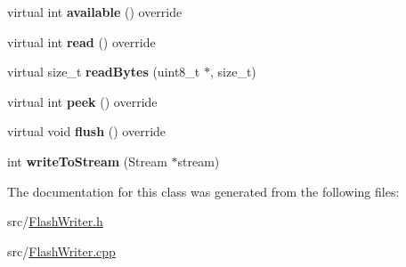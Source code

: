 \begin{DoxyCompactItemize}
virtual int {\bfseries available} () override
\item 
\mbox{\label{class_flash_writer_a4663c0f6af43e917bdc3da3e713ce4d8}} 
virtual int {\bfseries read} () override
\item 
\mbox{\label{class_flash_writer_aa28215079911b918877cf1bd48a19ca7}} 
virtual size\+\_\+t {\bfseries read\+Bytes} (uint8\+\_\+t $\ast$, size\+\_\+t)
\item 
\mbox{\label{class_flash_writer_ab9a55816c9ae25b7a07c444ff93811d4}} 
virtual int {\bfseries peek} () override
\item 
\mbox{\label{class_flash_writer_a3d68a95de1159906ad910aa14530ff00}} 
virtual void {\bfseries flush} () override
\item 
\mbox{\label{class_flash_writer_aeada2f4f7a906b30f0affce61551ad92}} 
int {\bfseries write\+To\+Stream} (Stream $\ast$stream)
\end{DoxyCompactItemize}


The documentation for this class was generated from the following files\+:\begin{DoxyCompactItemize}
\item 
src/\hyperlink{_flash_writer_8h}{Flash\+Writer.\+h}\item 
src/\hyperlink{_flash_writer_8cpp}{Flash\+Writer.\+cpp}\end{DoxyCompactItemize}
